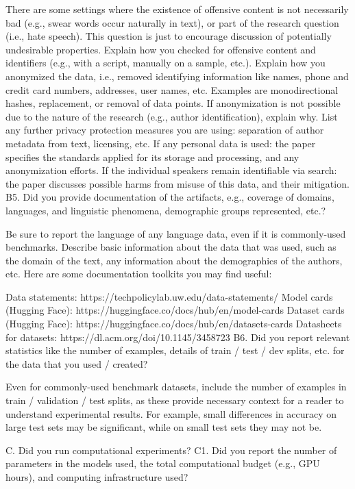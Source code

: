 There are some settings where the existence of offensive content is not necessarily bad (e.g., swear words occur naturally in text), or part of the research question (i.e., hate speech). This question is just to encourage discussion of potentially undesirable properties.
Explain how you checked for offensive content and identifiers (e.g., with a script, manually on a sample, etc.).
Explain how you anonymized the data, i.e., removed identifying information like names, phone and credit card numbers, addresses, user names, etc. Examples are monodirectional hashes, replacement, or removal of data points. If anonymization is not possible due to the nature of the research (e.g., author identification), explain why.
List any further privacy protection measures you are using: separation of author metadata from text, licensing, etc.
If any personal data is used: the paper specifies the standards applied for its storage and processing, and any anonymization efforts.
If the individual speakers remain identifiable via search: the paper discusses possible harms from misuse of this data, and their mitigation.
B5. Did you provide documentation of the artifacts, e.g., coverage of domains, languages, and linguistic phenomena, demographic groups represented, etc.?

Be sure to report the language of any language data, even if it is commonly-used benchmarks.
Describe basic information about the data that was used, such as the domain of the text, any information about the demographics of the authors, etc.
Here are some documentation toolkits you may find useful:

Data statements: https://techpolicylab.uw.edu/data-statements/
Model cards (Hugging Face): https://huggingface.co/docs/hub/en/model-cards
Dataset cards (Hugging Face): https://huggingface.co/docs/hub/en/datasets-cards
Datasheets for datasets: https://dl.acm.org/doi/10.1145/3458723
B6. Did you report relevant statistics like the number of examples, details of train / test / dev splits, etc. for the data that you used / created?

Even for commonly-used benchmark datasets, include the number of examples in train / validation / test splits, as these provide necessary context for a reader to understand experimental results. For example, small differences in accuracy on large test sets may be significant, while on small test sets they may not be.

C. Did you run computational experiments?
C1. Did you report the number of parameters in the models used, the total computational budget (e.g., GPU hours), and computing infrastructure used?

